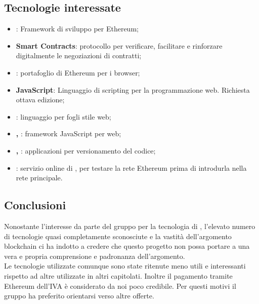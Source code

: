 \subsection{Tecnologie interessate}
\begin{itemize}
    \item \textbf{}: Framework di sviluppo per Ethereum;\phantom{.}
    \item \textbf{Smart Contracts}: protocollo per verificare, facilitare e rinforzare digitalmente le negoziazioni di contratti;\phantom{.}
    \item \textbf{}: portafoglio di Ethereum per i browser;\phantom{.}
    \item \textbf{JavaScript}: Linguaggio di scripting per la programmazione web. Richiesta ottava edizione;\phantom{.}
    \item \textbf{}: linguaggio per fogli stile web;\phantom{.}
    \item \textbf{, }: framework JavaScript per web;\phantom{.}
    \item \textbf{, }: applicazioni per versionamento del codice;\phantom{.}
    \item \textbf{}: servizio online di , per testare la rete Ethereum prima di introdurla nella rete principale.
    
\end{itemize}   

\subsection{Conclusioni}
Nonostante l’interesse da parte del gruppo per la tecnologia di , l’elevato
numero di tecnologie quasi completamente sconosciute e la vastità dell’argomento blockchain ci ha indotto a credere che questo progetto non possa portare a una vera e propria comprensione e padronanza dell’argomento. 
\\Le tecnologie utilizzate comunque sono state ritenute meno utili e interessanti rispetto ad altre utilizzate in altri capitolati. Inoltre il pagamento tramite Ethereum dell’IVA è considerato da noi poco credibile. Per questi motivi il gruppo ha preferito orientarsi verso altre offerte.
